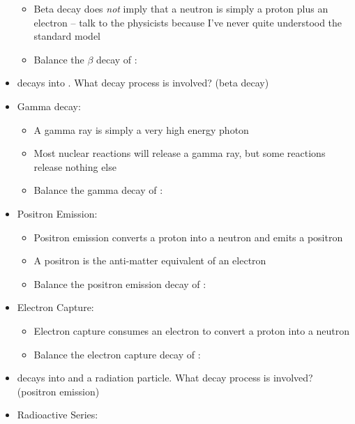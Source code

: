 \documentclass[12pt, openany, letterpaper]{memoir}
\begin{document}
\begin{itemize}
\begin{itemize}
		\item Beta decay does \emph{not} imply that a neutron is simply a proton plus an electron -- talk to the physicists because I've never quite understood the standard model
		\item Balance the $\beta$ decay of : \hspace{1em} 
	\end{itemize}
	\item {} decays into . What decay process is involved? (beta decay)
	\item Gamma decay:
	\begin{itemize}
		\item A gamma ray is simply a very high energy photon
		\item Most nuclear reactions will release a gamma ray, but some reactions release nothing else
		\item Balance the gamma decay of : \hspace{1em} 
	\end{itemize}
	\item Positron Emission:
	\begin{itemize}
		\item Positron emission converts a proton into a neutron and emits a positron
		\item A positron is the anti-matter equivalent of an electron
		\item Balance the positron emission decay of : \hspace{1em} 
	\end{itemize}
	\item Electron Capture:
	\begin{itemize}
		\item Electron capture consumes an electron to convert a proton into a neutron
		\item Balance the electron capture decay of : \hspace{1em}  
	\end{itemize}
	\item {} decays into  and a radiation particle. What decay process is involved? (positron emission)
	\item Radioactive Series:
	\begin{itemize}

\end{itemize}
\end{itemize}
\end{document}

